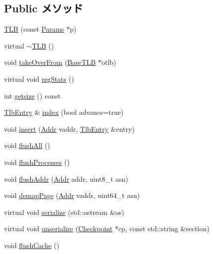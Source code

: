 \subsection*{Public メソッド}
\begin{DoxyCompactItemize}
\item 
\hyperlink{classAlphaISA_1_1TLB_acb886bd3c59f00c21be9ceaaf25dab97}{TLB} (const \hyperlink{classAlphaISA_1_1TLB_a9c268a4095d94dfb9eafa97cb58fcc5b}{Params} $\ast$p)
\item 
virtual \hyperlink{classAlphaISA_1_1TLB_a18a1722ab7889997b15fd7b9fc33c7ff}{$\sim$TLB} ()
\item 
void \hyperlink{classAlphaISA_1_1TLB_a15b6c15c1be2ca4de3e65772a02aa29f}{takeOverFrom} (\hyperlink{classBaseTLB}{BaseTLB} $\ast$otlb)
\item 
virtual void \hyperlink{classAlphaISA_1_1TLB_a4dc637449366fcdfc4e764cdf12d9b11}{regStats} ()
\item 
int \hyperlink{classAlphaISA_1_1TLB_ae121404a6cfcf714e05fe2231ce4c7fc}{getsize} () const 
\item 
\hyperlink{structAlphaISA_1_1TlbEntry}{TlbEntry} \& \hyperlink{classAlphaISA_1_1TLB_ab208f0d14ee1cc1eb06a1b6e6f1bd1b9}{index} (bool advance=true)
\item 
void \hyperlink{classAlphaISA_1_1TLB_a47905393ad1ab88c483d3f512327aedc}{insert} (\hyperlink{classm5_1_1params_1_1Addr}{Addr} vaddr, \hyperlink{structAlphaISA_1_1TlbEntry}{TlbEntry} \&entry)
\item 
void \hyperlink{classAlphaISA_1_1TLB_aca1483a67aee5a91e442f7131d66bcbd}{flushAll} ()
\item 
void \hyperlink{classAlphaISA_1_1TLB_a1d200c761e7041c940eb452220c466d7}{flushProcesses} ()
\item 
void \hyperlink{classAlphaISA_1_1TLB_acac93fcf5aeb0db9145137bd198cb417}{flushAddr} (\hyperlink{classm5_1_1params_1_1Addr}{Addr} addr, uint8\_\-t asn)
\item 
void \hyperlink{classAlphaISA_1_1TLB_a2d698ff909513b48a1263f8a5440e067}{demapPage} (\hyperlink{classm5_1_1params_1_1Addr}{Addr} vaddr, uint64\_\-t asn)
\item 
virtual void \hyperlink{classAlphaISA_1_1TLB_ad6272f80ae37e8331e3969b3f072a801}{serialize} (std::ostream \&os)
\item 
virtual void \hyperlink{classAlphaISA_1_1TLB_af100c4e9feabf3cd918619c88c718387}{unserialize} (\hyperlink{classCheckpoint}{Checkpoint} $\ast$cp, const std::string \&section)
\item 
void \hyperlink{classAlphaISA_1_1TLB_ab93a13c29b6326413ba76bdd7e54ad41}{flushCache} ()

\end{DoxyCompactItemize}
